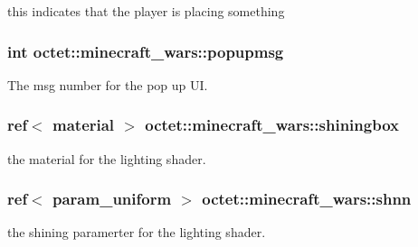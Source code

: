 this indicates that the player is placing something 

\hypertarget{classoctet_1_1minecraft__wars_aff5e77fadc9292cc353969851ee6e5ac}{
\subsubsection[{popupmsg}]{\setlength{\rightskip}{0pt plus 5cm}int octet\+::minecraft\+\_\+wars\+::popupmsg\hspace{0.3cm}{\ttfamily [private]}}}\label{classoctet_1_1minecraft__wars_aff5e77fadc9292cc353969851ee6e5ac}


The msg number for the pop up U\+I. 

\hypertarget{classoctet_1_1minecraft__wars_a13bdb9153c1d5fd497f5c0b7503d28d3}{
\subsubsection[{shiningbox}]{\setlength{\rightskip}{0pt plus 5cm}ref$<$ material $>$ octet\+::minecraft\+\_\+wars\+::shiningbox\hspace{0.3cm}{\ttfamily [private]}}}\label{classoctet_1_1minecraft__wars_a13bdb9153c1d5fd497f5c0b7503d28d3}


the material for the lighting shader. 

\hypertarget{classoctet_1_1minecraft__wars_ae1bffb6f992f549b9f5664b9c81e114b}{
\subsubsection[{shnn}]{\setlength{\rightskip}{0pt plus 5cm}ref$<$ param\+\_\+uniform $>$ octet\+::minecraft\+\_\+wars\+::shnn\hspace{0.3cm}{\ttfamily [private]}}}\label{classoctet_1_1minecraft__wars_ae1bffb6f992f549b9f5664b9c81e114b}


the shining paramerter for the lighting shader. 

